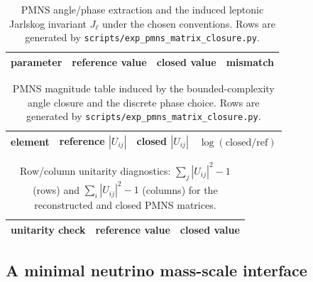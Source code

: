 \begin{table}[t]
\centering
\small
\setlength{\tabcolsep}{6pt}
\renewcommand{\arraystretch}{1.15}
\begin{tabular}{lrrr}
\toprule
parameter & reference value & closed value & mismatch \\
\midrule
%
\end{tabular}
\caption{PMNS angle/phase extraction and the induced leptonic Jarlskog invariant $J_\ell$ under the chosen conventions. Rows are generated by \texttt{scripts/exp\_pmns\_matrix\_closure.py}.}
\label{tab:pmns_angles}
\end{table}

\begin{table}[t]
\centering
\small
\setlength{\tabcolsep}{6pt}
\renewcommand{\arraystretch}{1.15}
\begin{tabular}{lrrr}
\toprule
element & reference $|U_{ij}|$ & closed $|U_{ij}|$ & $\log(\mathrm{closed}/\mathrm{ref})$ \\
\midrule
%
\end{tabular}
\caption{PMNS magnitude table induced by the bounded-complexity angle closure and the discrete phase choice. Rows are generated by \texttt{scripts/exp\_pmns\_matrix\_closure.py}.}
\label{tab:pmns_matrix}
\end{table}

\begin{table}[t]
\centering
\small
\setlength{\tabcolsep}{10pt}
\renewcommand{\arraystretch}{1.15}
\begin{tabular}{lrr}
\toprule
unitarity check & reference value & closed value \\
\midrule
%
\end{tabular}
\caption{Row/column unitarity diagnostics: $\sum_j |U_{ij}|^2-1$ (rows) and $\sum_i |U_{ij}|^2-1$ (columns) for the reconstructed and closed PMNS matrices.}
\label{tab:pmns_unitarity}
\end{table}

\subsection{A minimal neutrino mass-scale interface}
\label{subsec:neutrino_mass_interface}

